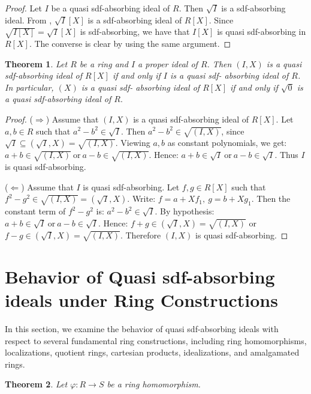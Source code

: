 \documentclass{amsart}%
\newtheorem{theorem}{Theorem}[section]
\begin{document}
\begin{proof}
Let $I$ be a quasi sdf-absorbing ideal of $R.$ Then $\sqrt{I}$ is a
sdf-absorbing ideal. From \cite[Theorem 4.5]{AB2024}, $\sqrt{I}[X]$ is a
sdf-absorbing ideal of $R[X]$. Since $\sqrt{I[X]}=\sqrt{I}[X]$ is
sdf-absorbing, we have that $I[X]$ is quasi sdf-absorbing in $R[X].$ The
converse is clear by using the same argument.
\end{proof}

\begin{theorem}
Let $R$ be a ring and $I$ a proper ideal of $R$. Then $(I,X)$ is a quasi
sdf-absorbing ideal of $R[X]$ if and only if $I$ is a quasi sdf- absorbing
ideal of $R$. In particular, $(X)$ is a quasi sdf- absorbing ideal of $R[X]$
if and only if $\sqrt{0}$ is a quasi sdf-absorbing ideal of $R.$
\end{theorem}

\begin{proof}
($\Rightarrow$) Assume that $(I,X)$ is a quasi sdf-absorbing ideal of $R[X]$.
Let $a,b\in R$ such that $a^{2}-b^{2}\in\sqrt{I}.$ Then $a^{2}-b^{2}\in
\sqrt{(I,X)}$, since $\sqrt{I}\subseteq(\sqrt{I},X)=\sqrt{(I,X)}$. Viewing
$a,b$ as constant polynomials, we get: $a+b\in\sqrt{(I,X)}\ \text{or}%
\ a-b\in\sqrt{(I,X)}.$ Hence: $a+b\in\sqrt{I}\ \text{or}\ a-b\in\sqrt{I}.$
Thus $I$ is quasi sdf-absorbing.

($\Leftarrow$) Assume that $I$ is quasi sdf-absorbing. Let $f,g\in R[X]$ such
that $f^{2}-g^{2}\in\sqrt{(I,X)}=(\sqrt{I},X).$ Write: $f=a+Xf_{1}%
,\ g=b+Xg_{1}.$ Then the constant term of $f^{2}-g^{2}$ is: $a^{2}-b^{2}%
\in\sqrt{I}.$ By hypothesis: $a+b\in\sqrt{I}\ \text{or}\ a-b\in\sqrt{I}.$
Hence: $f+g\in(\sqrt{I},X)=\sqrt{(I,X)}$ or $f-g\in(\sqrt{I},X)=\sqrt{(I,X)}.$
Therefore $(I,X)$ is quasi sdf-absorbing.
\end{proof}

\section{Behavior of Quasi sdf-absorbing ideals under Ring Constructions}

In this section, we examine the behavior of quasi sdf-absorbing ideals with
respect to several fundamental ring constructions, including ring
homomorphisms, localizations, quotient rings, cartesian products,
idealizations, and amalgamated rings.

\begin{theorem}
\label{T} Let $\varphi:R\rightarrow S$ be a ring homomorphism.
\end{theorem}
\end{document}
